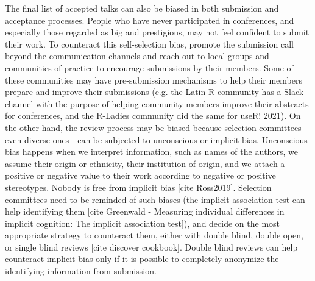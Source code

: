 \documentclass[10pt,letterpaper]{article}
\begin{document}

The final list of accepted talks can also be biased in both submission and acceptance processes. 
People who have never participated in conferences, and especially those regarded as big and prestigious, may not feel confident to submit their work.
To counteract this self-selection bias, promote the submission call beyond the communication channels and reach out to local groups and communities of practice to encourage submissions by their members.
Some of these communities may have pre-submission mechanisms to help their members prepare and improve their submissions (e.g. the Latin-R community has a Slack channel with the purpose of helping community members improve their abstracts for conferences, and the R-Ladies community did the same for useR! 2021).%
On the other hand, the review process may be biased because selection committees—even diverse ones—can be subjected to unconscious or implicit bias.
Unconscious bias happens when we interpret information, such as names of the authors, we assume their origin or ethnicity, their institution of origin, and we attach a positive or negative value to their work according to negative or positive stereotypes. Nobody is free from implicit bias [cite Ross2019].
Selection committees need to be reminded of such biases (the implicit association test can help identifying them [cite Greenwald - Measuring individual differences in implicit cognition: The implicit association test]), and
decide on the most appropriate strategy to counteract them, either with double blind, double open, or single blind reviews [cite discover cookbook].
Double blind reviews can help counteract implicit bias only if it is possible to completely anonymize the identifying information from submission. 
\end{document}

